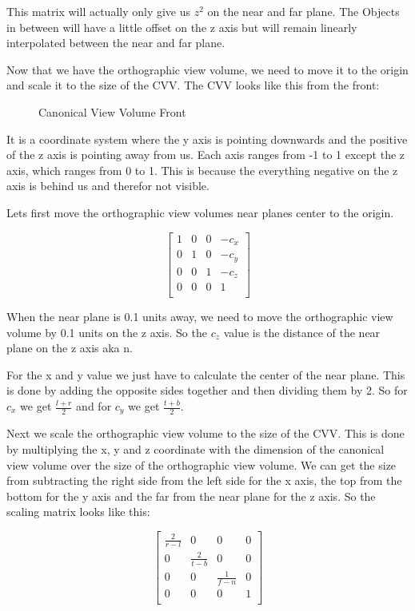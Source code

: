 \documentclass[12pt]{report} \usepackage{preamble}
\begin{document}
This matrix will actually only give us \(z^2\) on the near and far plane. The Objects in between will have
a little offset on the z axis but will remain linearly interpolated between the near and far plane.

Now that we have the orthographic view volume, we need to move it to the origin and
scale it to the size of the CVV. The CVV looks like this from the front:

\begin{figure}[hbtp]
	\centering 
	\caption{Canonical View Volume Front}
\end{figure} \FloatBarrier

It is a coordinate system where the y axis is pointing downwards and the positive of the z axis
is pointing away from us. Each axis ranges from -1 to 1 except the z axis,
which ranges from 0 to 1. This is because the everything negative on the z axis
is behind us and therefor not visible.

Lets first move the orthographic view volumes near planes center to the origin.

\[
	\begin{bmatrix}
		1 & 0 & 0 & -c_x \\
		0 & 1 & 0 & -c_y \\
		0 & 0 & 1 & -c_z \\
		0 & 0 & 0 & 1    \\
	\end{bmatrix}
\]


When the near plane is 0.1 units away, we need to move the orthographic view volume
by 0.1 units on the z axis. So the \(c_z\) value is the distance of the near
plane on the z axis aka n.

For the x and y value we just have to calculate the center of the near plane.
This is done by adding the opposite sides together and then dividing them by 2.
So for \(c_x\) we get \(\frac{l + r}{2}\) and for \(c_y\) we get \(\frac{t + b}{2}\).

Next we scale the orthographic view volume to the size of the CVV.
This is done by multiplying the x, y and z coordinate
with the dimension of the canonical view volume over the size of the orthographic view volume.
We can get the size from subtracting the right side from the left side for the x axis,
the top from the bottom for the y axis and the far from the near plane for the z axis.
So the scaling matrix looks like this:

\[
	\begin{bmatrix}
		\frac{2}{r - l} & 0               & 0               & 0 \\
		0               & \frac{2}{t - b} & 0               & 0 \\
		0               & 0               & \frac{1}{f - n} & 0 \\
		0               & 0               & 0               & 1 \\
	\end{bmatrix}
\]
\end{document}
